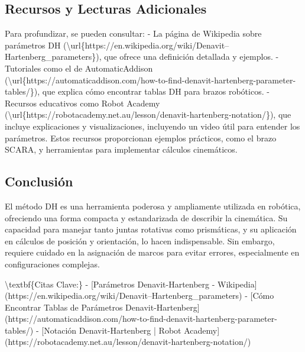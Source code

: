\documentclass{article}%
\begin{document}
\subsection{Recursos y Lecturas Adicionales}%
\label{subsec:RecursosyLecturasAdicionales}%
Para profundizar, se pueden consultar:\newline%
%
{-} La página de Wikipedia sobre parámetros DH (\textbackslash{}url\{https://en.wikipedia.org/wiki/Denavit–Hartenberg\_parameters\}), que ofrece una definición detallada y ejemplos.\newline%
%
{-} Tutoriales como el de AutomaticAddison (\textbackslash{}url\{https://automaticaddison.com/how{-}to{-}find{-}denavit{-}hartenberg{-}parameter{-}tables/\}), que explica cómo encontrar tablas DH para brazos robóticos.\newline%
%
{-} Recursos educativos como Robot Academy (\textbackslash{}url\{https://robotacademy.net.au/lesson/denavit{-}hartenberg{-}notation/\}), que incluye explicaciones y visualizaciones, incluyendo un video útil para entender los parámetros.\newline%
%
Estos recursos proporcionan ejemplos prácticos, como el brazo SCARA, y herramientas para implementar cálculos cinemáticos.\newline%

%
\subsection{Conclusión}%
\label{subsec:Conclusin}%
El método DH es una herramienta poderosa y ampliamente utilizada en robótica, ofreciendo una forma compacta y estandarizada de describir la cinemática. Su capacidad para manejar tanto juntas rotativas como prismáticas, y su aplicación en cálculos de posición y orientación, lo hacen indispensable. Sin embargo, requiere cuidado en la asignación de marcos para evitar errores, especialmente en configuraciones complejas.\newline%

%
\textbackslash{}textbf\{Citas Clave:\}\newline%
%
{-} {[}Parámetros Denavit{-}Hartenberg {-} Wikipedia{]}(https://en.wikipedia.org/wiki/Denavit–Hartenberg\_parameters)\newline%
%
{-} {[}Cómo Encontrar Tablas de Parámetros Denavit{-}Hartenberg{]}(https://automaticaddison.com/how{-}to{-}find{-}denavit{-}hartenberg{-}parameter{-}tables/)\newline%
%
{-} {[}Notación Denavit{-}Hartenberg | Robot Academy{]}(https://robotacademy.net.au/lesson/denavit{-}hartenberg{-}notation/)\newline%

%
\end{document}

